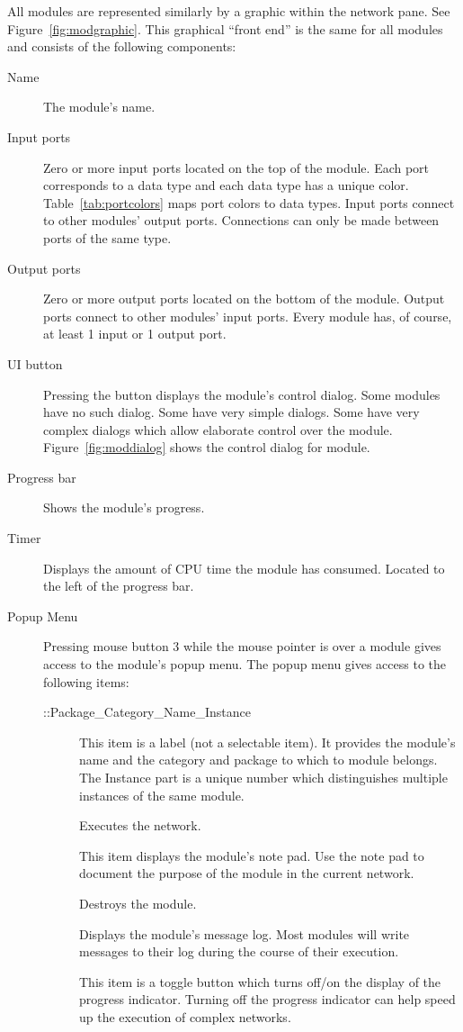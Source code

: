 All modules are represented similarly by a graphic within the network pane.
See Figure~\ref{fig:modgraphic}. This graphical ``front end'' is the same
for all modules and consists of the following components:

\begin{description}
\item[Name] The module's name.
\item[Input ports] Zero or more input ports located on the top of the
  module.  Each port corresponds to a data type and each data type has a
  unique color.  Table~\ref{tab:portcolors} maps port colors to data types.
  Input ports connect to other modules' output ports.  Connections can only
  be made between ports of the same type.
\item[Output ports] Zero or more output ports located on the bottom of the
  module.  Output ports connect to other modules' input ports.  Every
  module has, of course, at least 1 input or 1 output port.
\item[UI button] Pressing the  button displays the module's
  control dialog. Some modules have no such dialog. Some have very simple
  dialogs.  Some have very complex dialogs which allow elaborate control
  over the module.  Figure~\ref{fig:moddialog} shows the control dialog for
   module.
\item[Progress bar] Shows the module's progress.
\item[Timer] Displays the amount of CPU time the module has consumed.
  Located to the left of the progress bar.
\item[Popup Menu] Pressing mouse button 3 while the mouse
  pointer is over a module gives access to the module's popup menu.  The
  popup menu gives access to the following items:
  \begin{description}
  \item[::Package\_Category\_Name\_Instance] This item is a label (not a
    selectable item).  It provides the module's name and the category and
    package to which to module belongs.  The Instance part is a unique
    number which distinguishes multiple instances of the same module.
  \item[] Executes the network.
  \item[] This item displays the module's note pad.  Use the note pad
    to document the purpose of the module in the current network.
  \item[] Destroys the module.
  \item[] Displays the module's message log.  Most modules will
    write messages to their log during the course of their execution.
  \item[] This item is a toggle button which turns off/on the
    display of the progress indicator.  Turning off the progress indicator
    can help speed up the execution of complex networks.
  \end{description}
\end{description}

